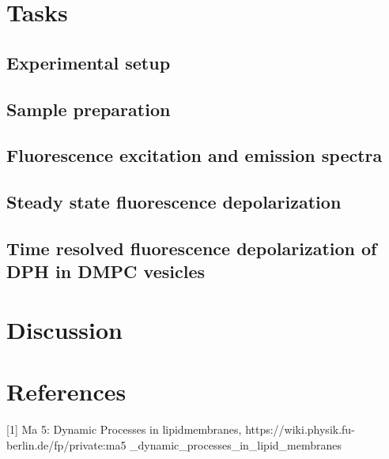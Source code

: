 \documentclass{article}
\begin{document}
\section{Tasks}
\subsection{Experimental setup}
\subsection{Sample preparation}
\subsection{Fluorescence excitation and emission spectra}
\subsection{Steady state fluorescence depolarization}
\subsection{Time resolved fluorescence depolarization of DPH in DMPC vesicles}
\section{Discussion}



\section*{References}

[1] Ma 5: Dynamic Processes in lipidmembranes, https://wiki.physik.fu-berlin.de/fp/private:ma5 \_dynamic\_processes\_in\_lipid\_membranes
\end{document}
